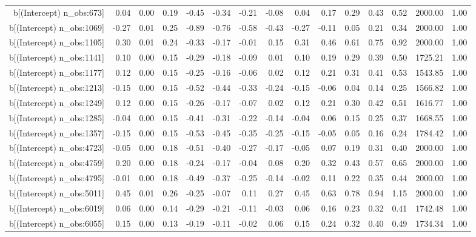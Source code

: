 \begin{table}[ht]
\begin{tabular}{rrrrrrrrrrrrrrr}
  b[(Intercept) n\_obs:673] & 0.04 & 0.00 & 0.19 & -0.45 & -0.34 & -0.21 & -0.08 & 0.04 & 0.17 & 0.29 & 0.43 & 0.52 & 2000.00 & 1.00 \\ 
  b[(Intercept) n\_obs:1069] & -0.27 & 0.01 & 0.25 & -0.89 & -0.76 & -0.58 & -0.43 & -0.27 & -0.11 & 0.05 & 0.21 & 0.34 & 2000.00 & 1.00 \\ 
  b[(Intercept) n\_obs:1105] & 0.30 & 0.01 & 0.24 & -0.33 & -0.17 & -0.01 & 0.15 & 0.31 & 0.46 & 0.61 & 0.75 & 0.92 & 2000.00 & 1.00 \\ 
  b[(Intercept) n\_obs:1141] & 0.10 & 0.00 & 0.15 & -0.29 & -0.18 & -0.09 & 0.01 & 0.10 & 0.19 & 0.29 & 0.39 & 0.50 & 1725.21 & 1.00 \\ 
  b[(Intercept) n\_obs:1177] & 0.12 & 0.00 & 0.15 & -0.25 & -0.16 & -0.06 & 0.02 & 0.12 & 0.21 & 0.31 & 0.41 & 0.53 & 1543.85 & 1.00 \\ 
  b[(Intercept) n\_obs:1213] & -0.15 & 0.00 & 0.15 & -0.52 & -0.44 & -0.33 & -0.24 & -0.15 & -0.06 & 0.04 & 0.14 & 0.25 & 1566.82 & 1.00 \\ 
  b[(Intercept) n\_obs:1249] & 0.12 & 0.00 & 0.15 & -0.26 & -0.17 & -0.07 & 0.02 & 0.12 & 0.21 & 0.30 & 0.42 & 0.51 & 1616.77 & 1.00 \\ 
  b[(Intercept) n\_obs:1285] & -0.04 & 0.00 & 0.15 & -0.41 & -0.31 & -0.22 & -0.14 & -0.04 & 0.06 & 0.15 & 0.25 & 0.37 & 1668.55 & 1.00 \\ 
  b[(Intercept) n\_obs:1357] & -0.15 & 0.00 & 0.15 & -0.53 & -0.45 & -0.35 & -0.25 & -0.15 & -0.05 & 0.05 & 0.16 & 0.24 & 1784.42 & 1.00 \\ 
  b[(Intercept) n\_obs:4723] & -0.05 & 0.00 & 0.18 & -0.51 & -0.40 & -0.27 & -0.17 & -0.05 & 0.07 & 0.19 & 0.31 & 0.40 & 2000.00 & 1.00 \\ 
  b[(Intercept) n\_obs:4759] & 0.20 & 0.00 & 0.18 & -0.24 & -0.17 & -0.04 & 0.08 & 0.20 & 0.32 & 0.43 & 0.57 & 0.65 & 2000.00 & 1.00 \\ 
  b[(Intercept) n\_obs:4795] & -0.01 & 0.00 & 0.18 & -0.49 & -0.37 & -0.25 & -0.14 & -0.02 & 0.11 & 0.22 & 0.35 & 0.44 & 2000.00 & 1.00 \\ 
  b[(Intercept) n\_obs:5011] & 0.45 & 0.01 & 0.26 & -0.25 & -0.07 & 0.11 & 0.27 & 0.45 & 0.63 & 0.78 & 0.94 & 1.15 & 2000.00 & 1.00 \\ 
  b[(Intercept) n\_obs:6019] & 0.06 & 0.00 & 0.14 & -0.29 & -0.21 & -0.11 & -0.03 & 0.06 & 0.16 & 0.23 & 0.32 & 0.41 & 1742.48 & 1.00 \\ 
  b[(Intercept) n\_obs:6055] & 0.15 & 0.00 & 0.13 & -0.19 & -0.11 & -0.02 & 0.06 & 0.15 & 0.24 & 0.32 & 0.40 & 0.49 & 1734.34 & 1.00 \\ 

\end{tabular}
\end{table}
